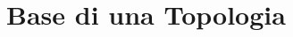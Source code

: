 \documentclass[10pt,a4paper]{article}
\theoremstyle{definition}
\theoremstyle{plain}
\theoremstyle{remark}
\theoremstyle{remark}
\begin{document}


\section{Base di una Topologia}




\end{document}
